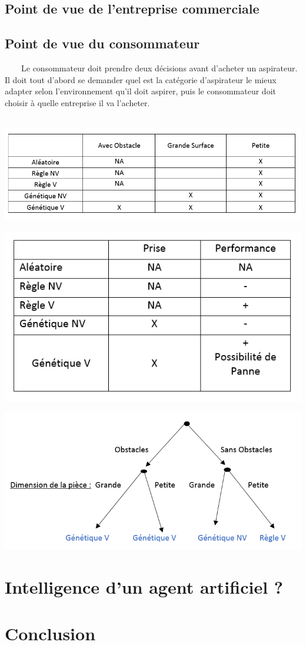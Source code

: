 \documentclass[a4paper,12pt]{report}
\begin{document}
\subsection{Point de vue de l'entreprise commerciale}
\subsection{Point de vue du consommateur}
\ \ \ \ Le consommateur doit prendre deux décisions avant d'acheter un aspirateur. Il doit tout d'abord se demander quel est la catégorie d'aspirateur le mieux adapter selon l'environnement qu'il doit aspirer, puis le consommateur doit choisir à quelle entreprise il va l'acheter. \\
\ \ \ \ \ 
\begin{center}
	\center
	\includegraphics[scale=1]{Consom1}
\end{center}
\begin{center}
	\center
	\includegraphics[scale=1]{Consom2}
\end{center}
\begin{center}
	\center
	\includegraphics[scale=1]{Consom3}
\end{center}

\section{Intelligence d'un agent artificiel ? }

\section{Conclusion}
\end{document}

